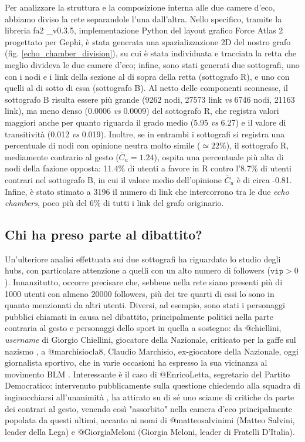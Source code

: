    Per analizzare la struttura e la composizione interna alle due camere d'eco, abbiamo diviso la rete separandole l'una dall'altra. Nello specifico, tramite la libreria fa2 \_v0.3.5, implementazione Python del layout grafico Force Atlas 2 progettato per Gephi, è stata generata una spazializzazione 2D del nostro grafo (fig. \ref{echo_chamber_division}), su cui è stata individuata e tracciata la retta che meglio divideva le due camere d'eco; infine, sono stati generati due sottografi, uno con i nodi e i link della sezione al di sopra della retta (sottografo R), e uno con quelli al di sotto di essa (sottografo B). Al netto delle componenti sconnesse, il sottografo B risulta essere più grande (9262 nodi, 27573 link \textit{vs} 6746 nodi, 21163 link), ma meno denso (0.0006 \textit{vs} 0.0009) del sottografo R, che registra valori maggiori anche per quanto riguarda il grado medio (5.95 \textit{vs} 6.27) e il valore di transitività (0.012 \textit{vs} 0.019). Inoltre, se in entrambi i sottografi si registra una percentuale di nodi con opinione neutra molto simile ($\simeq 22\%$), il sottografo R, mediamente contrario al gesto ($\bar{C}_{u} = 1.24$), ospita una percentuale più alta di nodi della fazione opposta: 11.4\% di utenti a favore in R contro l'8.7\% di utenti contrari nel sottografo B, in cui il valore medio dell'opinione $\bar{C}_{u}$ è di circa -0.81. Infine, è stato stimato a 3196 il numero di link che intercorrono tra le due \textit{echo chambers}, poco più del 6\% di tutti i link del grafo originario.
    
    \subsection{Chi ha preso parte al dibattito?}\label{who}
    Un'ulteriore analisi effettuata sui due sottografi ha riguardato lo studio degli hubs, con particolare attenzione a quelli con un alto numero di followers ($\texttt{vip} > 0$). Innanzitutto, occorre precisare che, sebbene nella rete siano presenti più di 1000 utenti con almeno 20000 followers, più dei tre quarti di essi lo sono in quanto menzionati da altri utenti.
    Diversi, ad esempio, sono stati i personaggi pubblici chiamati in causa nel dibattito, principalmente politici nella parte contraria al gesto e personaggi dello sport in quella a sostegno: da @chiellini, \textit{username} di Giorgio Chiellini, giocatore della Nazionale, criticato per la gaffe sul nazismo \cite{chiellini_nazismo}, a @marchisiocla8, Claudio Marchisio, ex-giocatore della Nazionale, oggi giornalista sportivo, che in varie occasioni ha espresso la sua vicinanza al movimento BLM \cite{marchisio}. Interessante è il caso di @EnricoLetta, segretario del Partito Democratico: intervenuto pubblicamente sulla questione chiedendo alla squadra di inginocchiarsi all'unanimità \cite{letta}, ha attirato su di sé uno sciame di critiche da parte dei contrari al gesto, venendo così "assorbito" nella camera d'eco principalmente popolata da questi ultimi, accanto ai nomi di @matteosalvinimi (Matteo Salvini, leader della Lega) e @GiorgiaMeloni (Giorgia Meloni, leader di Fratelli D'Italia).
    
